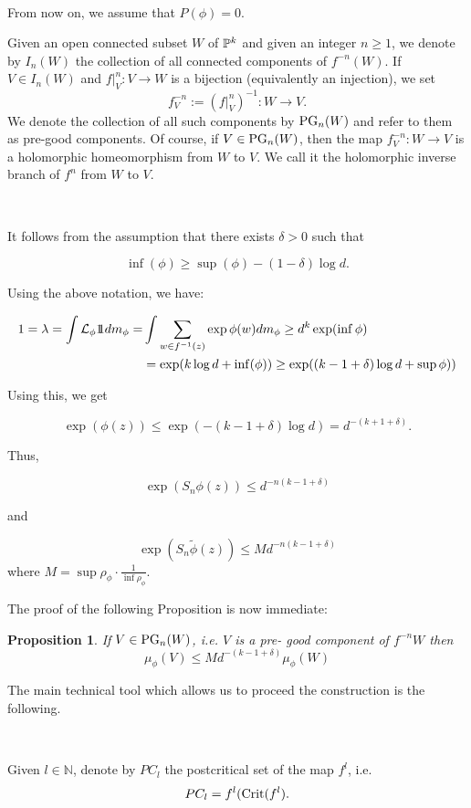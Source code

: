 \documentclass[12pt]{amsart}
\numberwithin{equation}{section}
\newcommand{\nl}{\newline}
\newtheorem{prop}[thm]{Proposition}
\def\1{1\!\!1}
\def\sp{\medskip}             \def\fr{\noindent}        \def\nl{\newline}
\begin{document}
\

From now on, we assume that $P(\phi)=0$.


\sp\fr Given an open connected subset $W$ of ${\mathbb P}^k$ and given an
integer $n\ge 1$, we denote by $I_n(W)$ the collection of all
connected components of $f^{-n}(W)$. If $V\in I_n(W)$ and $f|_V^n:V\to
W$ is a bijection (equivalently an injection), we set
$$
f_V^{-n}:=(f|_V^n)^{-1}:W\to V.
$$
We denote the collection of all such components by $\text{{\rm PG}}_n(W)$ and
refer to them as pre-good components. Of course, if $V\in\text{{\rm PG}}_n(W)$,
then the map $f_V^{-n}:W\to V$ is a holomorphic homeomorphism from $W$
to $V$. We call it the holomorphic inverse branch of $f^n$ from $W$ to
$V$. 

\


It follows from the assumption that there exists $\delta>0$ such that 

$$\inf (\phi)\ge\sup(\phi)-(1-\delta)\log d.$$

Using the above notation, we have:

$$
\aligned
1=\lambda=\int \mathcal{L}_\phi\1dm_\phi=&\int\sum_{w\in f^{-1}(z)}\exp\phi(w)dm_\phi\ge d^k\exp(\inf\phi)\\
&=\exp(k\log d +\inf (\phi))\ge \exp((k-1+\delta)\log d+\sup\phi))
\endaligned
$$


Using this, we get

$$\exp(\phi(z))\le \exp(-(k-1+\delta)\log d)=d^{-(k+1+\delta)}.$$

Thus,

$$\exp(S_n\phi(z))\le d^{-n(k-1+\delta)}$$

and

\begin{equation}
\exp(S_n\tilde\phi(z))\le Md^{-n(k-1+\delta)}
\end{equation}
where $M=\sup \rho_\phi\cdot \frac{1}{\inf \rho_\phi}$.

The proof of the following Proposition is now immediate:

\begin{prop}\label{miara_galezi}
If  $V\in\text{{\rm PG}}_n(W)$, i.e. $V$ is a pre- good component of $f^{-n}W$ then 
$$\mu_\phi(V)\le Md^{-(k-1+\delta)}\mu_\phi(W)$$
\end{prop}


The main technical tool which allows us to proceed the construction  is the following.

\

Given $l\in\mathbb{N}$, denote by $PC_l$ the postcritical set of the map $f^l$, i.e.
$$PC_l=f^l({\rm Crit}(f^l).$$
\end{document}

